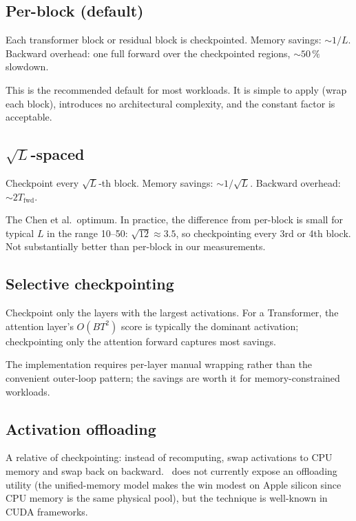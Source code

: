\subsection{Per-block (default)}
\label{ssec:gradient_checkpointing:per_block}

Each transformer block or residual block is checkpointed. Memory
savings: $\sim 1/L$. Backward overhead: one full forward over the
checkpointed regions, $\sim 50\,\%$ slowdown.

This is the recommended default for most workloads. It is simple
to apply (wrap each block), introduces no architectural complexity,
and the constant factor is acceptable.

\subsection{$\sqrt{L}$-spaced}
\label{ssec:gradient_checkpointing:sqrt_l}

Checkpoint every $\sqrt{L}$-th block. Memory savings: $\sim
1/\sqrt{L}$. Backward overhead: $\sim 2 T_{\text{fwd}}$.

The Chen et al.\ optimum. In practice, the difference from
per-block is small for typical $L$ in the range 10--50: $\sqrt{12}
\approx 3.5$, so checkpointing every 3rd or 4th block. Not
substantially better than per-block in our measurements.

\subsection{Selective checkpointing}
\label{ssec:gradient_checkpointing:selective_strat}

Checkpoint only the layers with the largest activations. For a
Transformer, the attention layer's $O(B T^2)$ score is typically
the dominant activation; checkpointing only the attention forward
captures most savings.

The implementation requires per-layer manual wrapping rather than
the convenient outer-loop pattern; the savings are worth it for
memory-constrained workloads.

\subsection{Activation offloading}
\label{ssec:gradient_checkpointing:offload}

A relative of checkpointing: instead of recomputing, swap
activations to CPU memory and swap back on backward. \Lucid\ does
not currently expose an offloading utility (the unified-memory
model makes the win modest on Apple silicon since CPU memory is
the same physical pool), but the technique is well-known in CUDA
frameworks.

